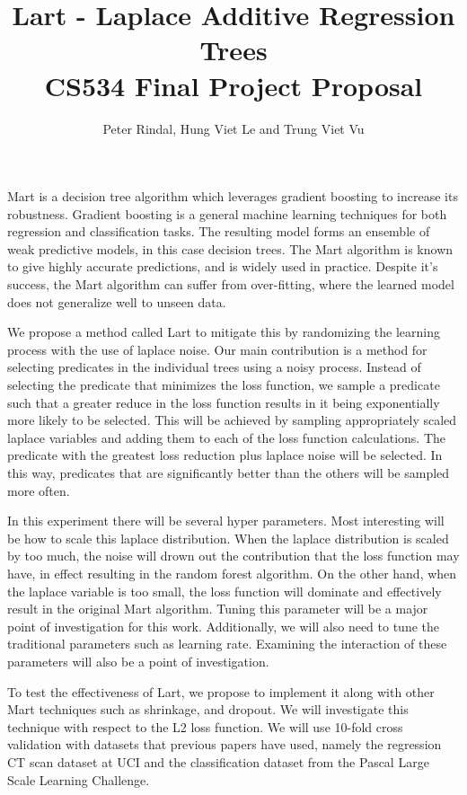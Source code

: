 \documentclass[]{scrartcl}
\title{Lart - Laplace Additive Regression Trees\\ \vspace{0.4cm}
	\large CS534 Final Project Proposal}
\author{Peter Rindal, Hung Viet Le and Trung Viet Vu}
\begin{document}
\maketitle

Mart \cite{friedman2003multiple} is a decision tree algorithm which leverages gradient boosting to increase its robustness. Gradient boosting is a general machine learning techniques for both regression and classification tasks. The resulting model forms an ensemble of weak predictive models, in this case decision trees.   The Mart algorithm is known to give highly accurate predictions\cite{rashmi2015dart}, and is widely used in practice. Despite it's success, the Mart algorithm can suffer from over-fitting, where the learned model does not generalize well to unseen data.

We propose a method called Lart to mitigate this by randomizing the learning process with the use of laplace noise. Our main contribution is a method for selecting predicates in the individual trees using a noisy process. Instead of selecting the predicate that minimizes the loss function, we sample a predicate such that a greater reduce in the loss function results in it being exponentially more likely to be selected. This will be achieved by sampling appropriately scaled laplace variables and adding them to each of the loss function calculations. The predicate with the greatest loss reduction plus laplace noise will be selected. In this way, predicates that are significantly better than the others will be sampled more often.

In this experiment there will be several hyper parameters. Most interesting will be how to scale this laplace distribution. When the laplace distribution is scaled by too much, the noise will drown out the contribution that the loss function may have, in effect resulting in the random forest algorithm. On the other hand, when the laplace variable is too small, the loss function will dominate and effectively result in the original Mart algorithm. Tuning this parameter will be a major point of investigation for this work. Additionally, we will also need to tune the traditional parameters such as learning rate. Examining the interaction of these parameters will also be a point of investigation.

To test the effectiveness of Lart, we propose to implement it along with other Mart techniques such as {shrinkage}\cite{sun2014convergence}, and {dropout}\cite{rashmi2015dart}. We will investigate this technique with respect to the L2 loss function. We will use 10-fold cross validation with datasets that previous papers have used, namely the regression CT scan dataset at UCI and the classification dataset  from the Pascal Large Scale Learning Challenge.




{}

\end{document}
